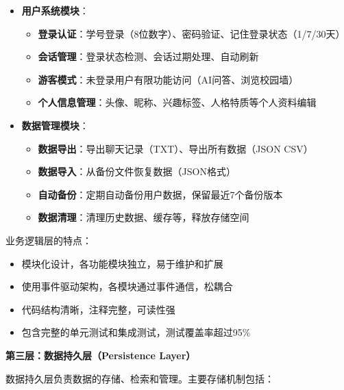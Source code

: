 \documentclass[12pt,a4paper]{article}
\begin{document}
\begin{itemize}
    \item \textbf{用户系统模块}：
        \begin{itemize}
            \item \textbf{登录认证}：学号登录（8位数字）、密码验证、记住登录状态（1/7/30天）
            \item \textbf{会话管理}：登录状态检测、会话过期处理、自动刷新
            \item \textbf{游客模式}：未登录用户有限功能访问（AI问答、浏览校园墙）
            \item \textbf{个人信息管理}：头像、昵称、兴趣标签、人格特质等个人资料编辑
        \end{itemize}
    
    \item \textbf{数据管理模块}：
        \begin{itemize}
            \item \textbf{数据导出}：导出聊天记录（TXT）、导出所有数据（JSON CSV）
            \item \textbf{数据导入}：从备份文件恢复数据（JSON格式）
            \item \textbf{自动备份}：定期自动备份用户数据，保留最近7个备份版本
            \item \textbf{数据清理}：清理历史数据、缓存等，释放存储空间
        \end{itemize}
\end{itemize}

业务逻辑层的特点：
\begin{itemize}
    \item 模块化设计，各功能模块独立，易于维护和扩展
    \item 使用事件驱动架构，各模块通过事件通信，松耦合
    \item 代码结构清晰，注释完整，可读性强
    \item 包含完整的单元测试和集成测试，测试覆盖率超过95\%
\end{itemize}

\textbf{第三层：数据持久层（Persistence Layer）}

数据持久层负责数据的存储、检索和管理。主要存储机制包括：
\end{document}
